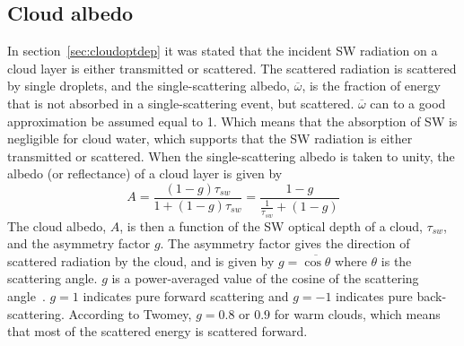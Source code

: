 \subsection{Cloud albedo}
In section~\ref{sec:cloudoptdep} it was stated that the incident SW radiation on a cloud layer is either transmitted or scattered. The scattered radiation is scattered by single droplets, and the single-scattering albedo, $\overline{\omega}$, is the fraction of energy that is not absorbed in a single-scattering event, but scattered. $\overline{\omega}$ can to a good approximation be assumed equal to 1. Which means that the absorption of SW is negligible for cloud water, which supports that the SW radiation is either transmitted or scattered. When the single-scattering albedo is taken to unity, the albedo (or reflectance) of a cloud layer is given by~\citep{Hobbs1993}%
\begin{equation}
A = \frac{(1-g)\tau_{sw}}{1+(1-g)\tau_{sw}} = \frac{1-g}{\frac{1}{\tau_{sw}}+(1-g)}
\label{eqn:cloudalbedo}
\end{equation}
The cloud albedo, $A$, is then a function of the SW optical depth of a cloud, $\tau_{sw}$, and the asymmetry factor $g$. The asymmetry factor gives the direction of scattered radiation by the cloud, and is given by $g=\overline{\cos \theta}$ where $\theta$ is the scattering angle. $g$ is a power-averaged value of the cosine of the scattering angle~\citep{Twomey1974}. $g=1$ indicates pure forward scattering and $g=-1$ indicates pure back-scattering. According to Twomey, $g=0.8$ or $0.9$ for warm clouds, which means that most of the scattered energy is scattered forward.




